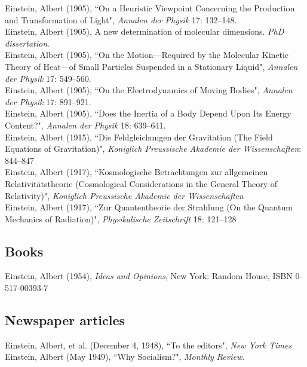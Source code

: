 \documentclass[11pt]{article} %
\begin{document}
Einstein, Albert (1905), “On a Heuristic Viewpoint Concerning the Production and Transformation of Light", \emph{Annalen der Physik} 17: 132–148.\\
Einstein, Albert (1905), A new determination of molecular dimensions. \emph{PhD dissertation}.\\
Einstein, Albert (1905), “On the Motion—Required by the Molecular Kinetic Theory of Heat—of Small Particles Suspended in a Stationary Liquid", \emph{Annalen der Physik} 17: 549–560.\\
Einstein, Albert (1905), “On the Electrodynamics of Moving Bodies", \emph{Annalen der Physik} 17: 891–921.\\
Einstein, Albert (1905), “Does the Inertia of a Body Depend Upon Its Energy Content?", \emph{Annalen der Physik} 18: 639–641.\\
Einstein, Albert (1915), “Die Feldgleichungen der Gravitation (The Field Equations of Gravitation)", \emph{Koniglich Preussische Akademie der Wissenschaften}: 844–847\\
Einstein, Albert (1917), “Kosmologische Betrachtungen zur allgemeinen Relativitätstheorie (Cosmological Considerations in the General Theory of Relativity)", \emph{Koniglich Preussische Akademie der Wissenschaften}\\
Einstein, Albert (1917), “Zur Quantentheorie der Strahlung (On the Quantum Mechanics of Radiation)", \emph{Physikalische Zeitschrift} 18: 121–128


\subsection*{Books}

Einstein, Albert (1954), \emph{Ideas and Opinions}, New York: Random House, ISBN 0-517-00393-7


\subsection*{Newspaper articles}

Einstein, Albert, et al. (December 4, 1948), “To the editors", \emph{New York Times}\\
Einstein, Albert (May 1949), “Why Socialism?", \emph{Monthly Review}.
\end{document}
